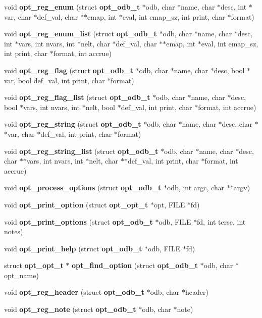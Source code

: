 \begin{CompactItemize}
\item 
void {\bf opt\_\-reg\_\-enum} (struct {\bf opt\_\-odb\_\-t} $\ast$odb, char $\ast$name, char $\ast$desc, int $\ast$var, char $\ast$def\_\-val, char $\ast$$\ast$emap, int $\ast$eval, int emap\_\-sz, int print, char $\ast$format)
\item 
void {\bf opt\_\-reg\_\-enum\_\-list} (struct {\bf opt\_\-odb\_\-t} $\ast$odb, char $\ast$name, char $\ast$desc, int $\ast$vars, int nvars, int $\ast$nelt, char $\ast$def\_\-val, char $\ast$$\ast$emap, int $\ast$eval, int emap\_\-sz, int print, char $\ast$format, int accrue)
\item 
void {\bf opt\_\-reg\_\-flag} (struct {\bf opt\_\-odb\_\-t} $\ast$odb, char $\ast$name, char $\ast$desc, bool $\ast$var, bool def\_\-val, int print, char $\ast$format)
\item 
void {\bf opt\_\-reg\_\-flag\_\-list} (struct {\bf opt\_\-odb\_\-t} $\ast$odb, char $\ast$name, char $\ast$desc, bool $\ast$vars, int nvars, int $\ast$nelt, bool $\ast$def\_\-val, int print, char $\ast$format, int accrue)
\item 
void {\bf opt\_\-reg\_\-string} (struct {\bf opt\_\-odb\_\-t} $\ast$odb, char $\ast$name, char $\ast$desc, char $\ast$$\ast$var, char $\ast$def\_\-val, int print, char $\ast$format)
\item 
void {\bf opt\_\-reg\_\-string\_\-list} (struct {\bf opt\_\-odb\_\-t} $\ast$odb, char $\ast$name, char $\ast$desc, char $\ast$$\ast$vars, int nvars, int $\ast$nelt, char $\ast$$\ast$def\_\-val, int print, char $\ast$format, int accrue)
\item 
void {\bf opt\_\-process\_\-options} (struct {\bf opt\_\-odb\_\-t} $\ast$odb, int argc, char $\ast$$\ast$argv)
\item 
void {\bf opt\_\-print\_\-option} (struct {\bf opt\_\-opt\_\-t} $\ast$opt, FILE $\ast$fd)
\item 
void {\bf opt\_\-print\_\-options} (struct {\bf opt\_\-odb\_\-t} $\ast$odb, FILE $\ast$fd, int terse, int notes)
\item 
void {\bf opt\_\-print\_\-help} (struct {\bf opt\_\-odb\_\-t} $\ast$odb, FILE $\ast$fd)
\item 
struct {\bf opt\_\-opt\_\-t} $\ast$ {\bf opt\_\-find\_\-option} (struct {\bf opt\_\-odb\_\-t} $\ast$odb, char $\ast$opt\_\-name)
\item 
void {\bf opt\_\-reg\_\-header} (struct {\bf opt\_\-odb\_\-t} $\ast$odb, char $\ast$header)
\item 
void {\bf opt\_\-reg\_\-note} (struct {\bf opt\_\-odb\_\-t} $\ast$odb, char $\ast$note)
\end{CompactItemize}
